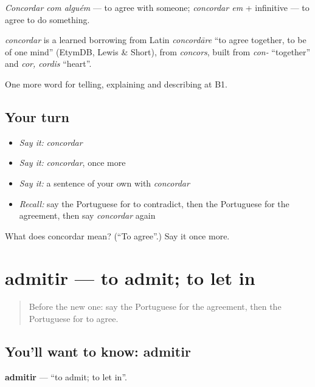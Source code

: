 \emph{Concordar com alguém} — to agree with someone; \emph{concordar em} + infinitive — to agree to do something.

\begin{cousinweb}
\emph{concordar} is a learned borrowing from Latin \emph{concordāre} \textquotedblleft{}to agree together, to be of one mind\textquotedblright{} (EtymDB, Lewis \& Short), from \emph{concors}, built from \emph{con-} \textquotedblleft{}together\textquotedblright{} and \emph{cor, cordis} \textquotedblleft{}heart\textquotedblright{}.
\end{cousinweb}

\begin{grammarlens}[title={What you've built}]
One more word for telling, explaining and describing at B1.
\end{grammarlens}

\subsection*{Your turn}
\begin{itemize}
\raggedright
  \item \emph{Say it:} \emph{concordar}
  \item \emph{Say it:} \emph{concordar}, once more
  \item \emph{Say it:} a sentence of your own with \emph{concordar}
  \item \emph{Recall:} say the Portuguese for to contradict, then the Portuguese for the agreement, then say \emph{concordar} again
\end{itemize}

\begin{tcolorbox}[breakable,colback=teal!4,colframe=teal!35!black,title={Before you move on}]
What does concordar mean? (\textquotedblleft{}To agree\textquotedblright{}.) Say it once more.
\end{tcolorbox}
\section[admitir]{admitir — to admit; to let in}

\label{lesson:PT-C339-admitir}



\begin{quote}
Before the new one: say the Portuguese for the agreement, then the Portuguese for to agree.
\end{quote}

\subsection*{You'll want to know: admitir}
\textbf{admitir} — \textquotedblleft{}to admit; to let in\textquotedblright{}.

